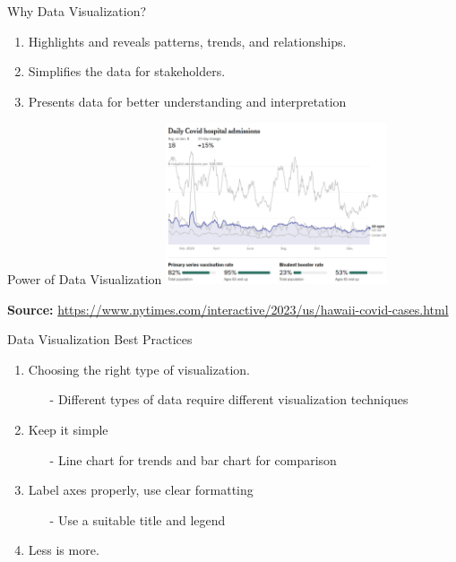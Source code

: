 \documentclass[aspectratio=169,xcolor=dvipsnames,svgnames,x11names,fleqn]{beamer}
\begin{document}

\begin{frame}{Why Data Visualization?}

\Large 
\begin{center}
    \begin{enumerate}
        \item Highlights and reveals patterns, trends, and relationships.
        \item Simplifies the data for stakeholders.
        \item Presents data for better understanding and interpretation
    \end{enumerate}
\end{center}
   
\end{frame}



\begin{frame}{Power of Data Visualization}
    \includegraphics[width=0.49\textwidth]{figures/covid19hawaii.png}
    
    {\textbf{Source: }\color{red} \url{https://www.nytimes.com/interactive/2023/us/hawaii-covid-cases.html}}
\end{frame}


\begin{frame}{Data Visualization Best Practices}
\begin{enumerate}
    \item Choosing the right type of visualization.
    \begin{itemize}
        \item[-] Different types of data require different visualization techniques
    \end{itemize}
    \item Keep it simple
    \begin{itemize}
        \item[-] Line chart for trends and bar chart for comparison
    \end{itemize}
    \item Label axes properly, use clear formatting
    \begin{itemize}
        \item[-] Use a suitable title and legend
    \end{itemize}
    \item Less is more.
\end{enumerate}
\end{frame}
\end{document}
